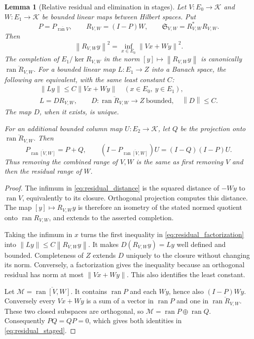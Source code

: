 \documentclass[11pt,a4paper]{amsart}
\numberwithin{equation}{section}
\newtheorem{lemma}[theorem]{Lemma}
\theoremstyle{definition}
\theoremstyle{remark}
\DeclareMathOperator{\ran}{ran}
\newcommand{\norm}[1]{\left\lVert#1\right\rVert}
\begin{document}
\begin{lemma}[Relative residual and elimination in stages]\label{lem:relative_residual}
Let $V:E_0\to\mathcal K$ and $W:E_1\to\mathcal K$ be bounded linear maps between Hilbert spaces. Put
\[
 P=P_{\overline{\ran V}},\qquad R_{V,W}=(I-P)W,
 \qquad \mathfrak S_{V,W}=R_{V,W}^*R_{V,W}.
\]
Then
\begin{equation}\label{eq:residual_distance}
 \norm{R_{V,W}y}^2=\inf_{x\in E_0}\norm{Vx+Wy}^2.
\end{equation}
The completion of $E_1/\ker R_{V,W}$ in the norm $[y]\mapsto\norm{R_{V,W}y}$ is canonically $\overline{\ran R_{V,W}}$. For a bounded linear map $L:E_1\to Z$ into a Banach space, the following are equivalent, with the same least constant $C$:
\begin{equation}\label{eq:residual_factorization}
 \begin{gathered}
 \norm{Ly}\le C\norm{Vx+Wy}\quad(x\in E_0,\ y\in E_1),\\
 L=D R_{V,W},\qquad
 D:\overline{\ran R_{V,W}}\to Z\ \text{bounded},\quad\norm D\le C.
 \end{gathered}
\end{equation}
The map $D$, when it exists, is unique.

For an additional bounded column map $U:E_2\to\mathcal K$, let $Q$ be the projection onto $\overline{\ran R_{V,W}}$. Then
\begin{equation}\label{eq:residual_staged}
 P_{\overline{\ran[V,W]}}=P+Q,
 \qquad
 (I-P_{\overline{\ran[V,W]}})U=(I-Q)(I-P)U.
\end{equation}
Thus removing the combined range of $V,W$ is the same as first removing $V$ and then the residual range of $W$.
\end{lemma}
\begin{proof}
The infimum in \eqref{eq:residual_distance} is the squared distance of $-Wy$ to $\ran V$, equivalently to its closure. Orthogonal projection computes this distance. The map $[y]\mapsto R_{V,W}y$ is therefore an isometry of the stated normed quotient onto $\ran R_{V,W}$, and extends to the asserted completion.

Taking the infimum in $x$ turns the first inequality in \eqref{eq:residual_factorization} into $\norm{Ly}\le C\norm{R_{V,W}y}$. It makes $D(R_{V,W}y)=Ly$ well defined and bounded. Completeness of $Z$ extends $D$ uniquely to the closure without changing its norm. Conversely, a factorization gives the inequality because an orthogonal residual has norm at most $\norm{Vx+Wy}$. This also identifies the least constant.

Let $\mathcal M=\overline{\ran[V,W]}$. It contains $\ran P$ and each $Wy$, hence also $(I-P)Wy$. Conversely every $Vx+Wy$ is a sum of a vector in $\ran P$ and one in $\overline{\ran R_{V,W}}$. These two closed subspaces are orthogonal, so
$\mathcal M=\ran P\oplus\ran Q$. Consequently $PQ=QP=0$, which gives both identities in \eqref{eq:residual_staged}.
\end{proof}
\end{document}
